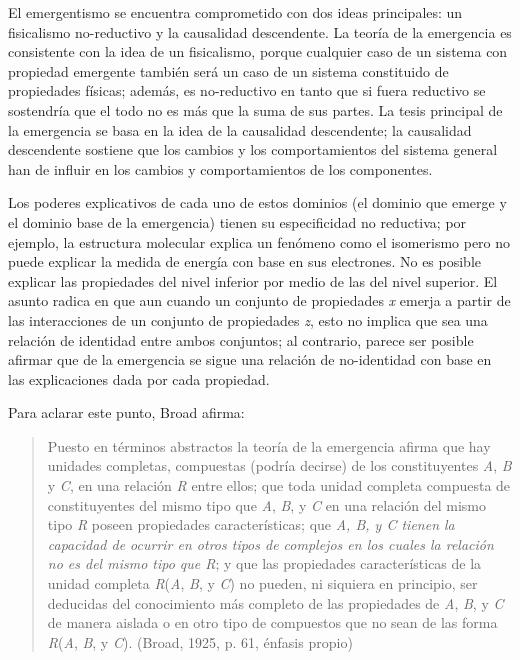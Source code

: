 \documentclass[]{book}
\begin{document}
El emergentismo se encuentra comprometido con dos ideas principales: un
fisicalismo no-reductivo y la causalidad descendente. La teoría de la
emergencia es consistente con la idea de un fisicalismo, porque
cualquier caso de un sistema con propiedad emergente también será un
caso de un sistema constituido de propiedades físicas; además, es
no-reductivo en tanto que si fuera reductivo se sostendría que el todo
no es más que la suma de sus partes. La tesis principal de la emergencia
se basa en la idea de la causalidad descendente; la causalidad
descendente sostiene que los cambios y los comportamientos del sistema
general han de influir en los cambios y comportamientos de los
componentes.

Los poderes explicativos de cada uno de estos dominios (el dominio que
emerge y el dominio base de la emergencia) tienen su especificidad no
reductiva; por ejemplo, la estructura molecular explica un fenómeno como
el isomerismo pero no puede explicar la medida de energía con base en
sus electrones. No es posible explicar las propiedades del nivel
inferior por medio de las del nivel superior. El asunto radica en que
aun cuando un conjunto de propiedades \emph{x} emerja a partir de las
interacciones de un conjunto de propiedades \emph{z}, esto no implica
que sea una relación de identidad entre ambos conjuntos; al contrario,
parece ser posible afirmar que de la emergencia se sigue una relación de
no-identidad con base en las explicaciones dada por cada propiedad.

Para aclarar este punto, Broad afirma:

\begin{quote}
Puesto en términos abstractos la teoría de la emergencia afirma que hay
unidades completas, compuestas (podría decirse) de los constituyentes
\emph{A}, \emph{B} y \emph{C}, en una relación \emph{R} entre ellos; que
toda unidad completa compuesta de constituyentes del mismo tipo que
\emph{A}, \emph{B}, y \emph{C} en una relación del mismo tipo \emph{R}
poseen propiedades características; que \emph{A, B, y C tienen la
capacidad de ocurrir en otros tipos de complejos en los cuales la
relación no es del mismo tipo que R}; y que las propiedades
características de la unidad completa \emph{R}(\emph{A}, \emph{B}, y
\emph{C}) no pueden, ni siquiera en principio, ser deducidas del
conocimiento más completo de las propiedades de \emph{A}, \emph{B}, y
\emph{C} de manera aislada o en otro tipo de compuestos que no sean de
las forma \emph{R}(\emph{A}, \emph{B}, y \emph{C}). (Broad, 1925, p. 61,
énfasis propio)
\end{quote}
\end{document}
